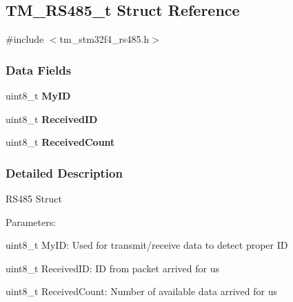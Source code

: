 \hypertarget{struct_t_m___r_s485__t}{}\subsection{T\+M\+\_\+\+R\+S485\+\_\+t Struct Reference}
\label{struct_t_m___r_s485__t}


{\ttfamily \#include $<$tm\+\_\+stm32f4\+\_\+rs485.\+h$>$}

\subsubsection*{Data Fields}
\begin{DoxyCompactItemize}
\item 
\hypertarget{struct_t_m___r_s485__t_aeef7932983ab539c4f8ddbf2299979a6}{}uint8\+\_\+t {\bfseries My\+I\+D}\label{struct_t_m___r_s485__t_aeef7932983ab539c4f8ddbf2299979a6}

\item 
\hypertarget{struct_t_m___r_s485__t_ab240bec98854b5cf9bee506a6d409618}{}uint8\+\_\+t {\bfseries Received\+I\+D}\label{struct_t_m___r_s485__t_ab240bec98854b5cf9bee506a6d409618}

\item 
\hypertarget{struct_t_m___r_s485__t_ac938cf35f0f2a12668166ce5b1a2332f}{}uint8\+\_\+t {\bfseries Received\+Count}\label{struct_t_m___r_s485__t_ac938cf35f0f2a12668166ce5b1a2332f}

\end{DoxyCompactItemize}


\subsubsection{Detailed Description}
R\+S485 Struct

Parameters\+:
\begin{DoxyItemize}
\item uint8\+\_\+t My\+I\+D\+: Used for transmit/receive data to detect proper I\+D
\item uint8\+\_\+t Received\+I\+D\+: I\+D from packet arrived for us
\item uint8\+\_\+t Received\+Count\+: Number of available data arrived for us 
\end{DoxyItemize}